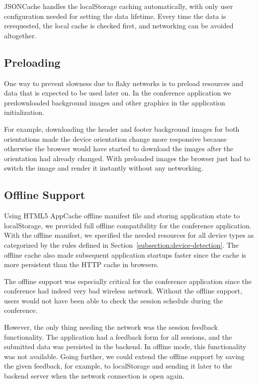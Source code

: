 JSONCache handles the localStorage caching automatically, with only
user configuration needed for setting the data lifetime. Every time
the data is rerequested, the local cache is checked first, and
networking can be avoided altogether.

\subsection{Preloading}

One way to prevent  slowness due to flaky networks is to
preload resources and data that is expected to be used later on. In
the conference application we predownloaded background images and
other graphics in the application initialization.

For example, downloading the header and footer background images for
both orientations made the device orientation change more responsive
because otherwise the browser would have started to download the
images after the orientation had already changed. With preloaded
images the browser just had to switch the image and render it
instantly without any networking.

\subsection{Offline Support}

Using HTML5 AppCache offline manifest file and storing application
state to localStorage, we provided full offline compatibility for the
conference application. With the offline manifest, we specified the
needed resources for all device types as categorized by the rules
defined in Section~\ref{subsection:device-detection}. The offline
cache also made subsequent application startups faster since the cache
is more persistent than the HTTP cache in browsers.

The offline support was especially critical for the conference
application since the conference had indeed very bad wireless network.
Without the offline support, users would not have been able to check
the session schedule during the conference.

However, the only thing needing the network was the session feedback
functionality. The application had a feedback form for all sessions,
and the submitted data was persisted in the backend. In offline mode,
this functionality was not available. Going further, we could extend
the offline support by saving the given feedback, for example, to
localStorage and sending it later to the backend server when the
network connection is open again.

